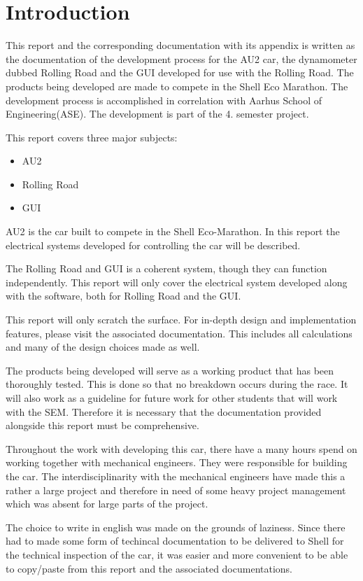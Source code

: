 \chapter{Introduction}
This report and the corresponding documentation with its appendix is written as the documentation of the development process for the AU2 car, the dynamometer dubbed Rolling Road and the GUI developed for use with the Rolling Road. The products being developed are made to compete in the Shell Eco Marathon. The development process is accomplished in correlation with Aarhus School of Engineering(ASE). The development is part of the 4. semester project. 

This report covers three major subjects:

\begin{itemize}
	\item{AU2}
	\item{Rolling Road}
	\item{GUI}
\end{itemize}

AU2 is the car built to compete in the Shell Eco-Marathon. In this report the electrical systems developed for controlling the car will be described. 

The Rolling Road and GUI is a coherent system, though they can function independently. This report will only cover the electrical system developed along with the software, both for Rolling Road and the GUI. 

This report will only scratch the surface. For in-depth design and implementation features, please visit the associated documentation. This includes all calculations and many of the design choices made as well.  

The products being developed will serve as a working product that has been thoroughly tested. This is done so that no breakdown occurs during the race. It will also work as a guideline for future work for other students that will work with the SEM. Therefore it is necessary that the documentation provided alongside this report must be comprehensive.

Throughout the work with developing this car, there have a many hours spend on working together with mechanical engineers. They were responsible for building the car. The interdisciplinarity with the mechanical engineers have made this a rather a large project and therefore in need of some heavy project management which was absent for large parts of the project. 

The choice to write in english was made on the grounds of laziness. Since there had to made some form of techincal documentation to be delivered to Shell for the technical inspection of the car, it was easier and more convenient to be able to copy/paste from this report and the associated documentations. 


